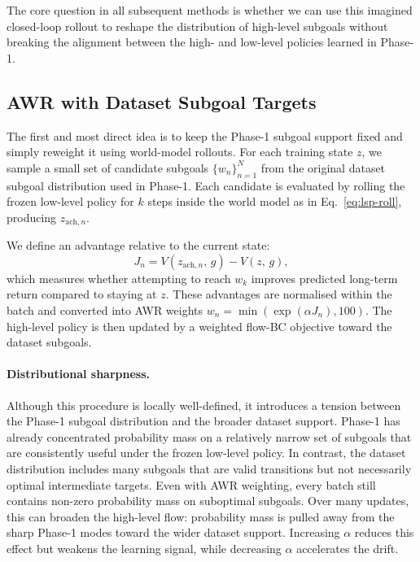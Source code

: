 The core question in all subsequent methods is whether we can use this imagined closed-loop rollout to reshape the distribution of high-level subgoals without breaking the alignment between the high- and low-level policies learned in Phase-1.

\subsection{AWR with Dataset Subgoal Targets}
\label{sec:lsp-awr-data}

The first and most direct idea is to keep the Phase-1 subgoal support fixed and simply reweight it using world-model rollouts. For each training state $z$, we sample a small set of candidate subgoals $\{w_n\}_{n=1}^N$ from the original dataset subgoal distribution used in Phase-1. Each candidate is evaluated by rolling the frozen low-level policy for $k$ steps inside the world model as in Eq.~\eqref{eq:lsp-roll}, producing $z_{\mathrm{ach},n}$.

We define an advantage relative to the current state:
\begin{equation}
J_n = V(z_{\mathrm{ach},n},\,g) - V(z,\,g),
\end{equation}
which measures whether attempting to reach $w_k$ improves predicted long-term return compared to staying at $z$. These advantages are normalised within the batch and converted into AWR weights $w_n = \min(\exp(\alpha J_n), 100)$. The high-level policy is then updated by a weighted flow-BC objective toward the dataset subgoals.

\paragraph{Distributional sharpness.}
Although this procedure is locally well-defined, it introduces a tension between the Phase-1 subgoal distribution and the broader dataset support. Phase-1 has already concentrated probability mass on a relatively narrow set of subgoals that are consistently useful under the frozen low-level policy. In contrast, the dataset distribution includes many subgoals that are valid transitions but not necessarily optimal intermediate targets.
Even with AWR weighting, every batch still contains non-zero probability mass on suboptimal subgoals. Over many updates, this can broaden the high-level flow: probability mass is pulled away from the sharp Phase-1 modes toward the wider dataset support. Increasing $\alpha$ reduces this effect but weakens the learning signal, while decreasing $\alpha$ accelerates the drift.

